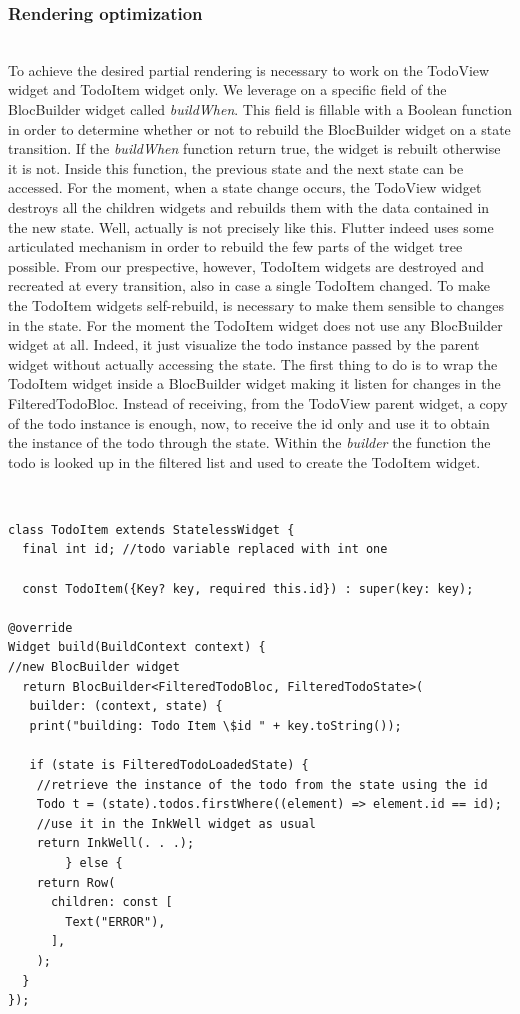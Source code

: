 \subsubsection{Rendering optimization}  \label{par:todo_app_inherited_widget_introduction}
\hfill\\
To achieve the desired partial rendering is necessary to work on the TodoView widget and TodoItem widget only. We leverage on a specific field of the BlocBuilder widget called \textit{buildWhen}. This field is fillable with a Boolean function in order to determine whether or not to rebuild the BlocBuilder widget on a state transition. If the \textit{buildWhen} function return true, the widget is rebuilt otherwise it is not. Inside this function,  the previous state and the next state can be accessed. For the moment, when a state change occurs, the TodoView widget destroys all the children widgets and rebuilds them with the data contained in the new state. Well, actually is not precisely like this. Flutter indeed uses some articulated mechanism in order to rebuild the few parts of the widget tree possible. From our prespective, however, TodoItem widgets are destroyed and recreated at every transition, also in case a single TodoItem changed. To make the TodoItem widgets self-rebuild,  is necessary to make them sensible to changes in the state. For the moment the TodoItem widget does not use any BlocBuilder widget at all. Indeed, it just visualize the todo instance passed by the parent widget without actually accessing the state. The first thing to do  is to wrap the TodoItem widget inside a BlocBuilder widget making it listen for changes in the FilteredTodoBloc. Instead of receiving, from the TodoView parent widget, a copy of the todo instance is enough, now, to receive the id only and use it to obtain the instance of the todo through the state. Within the \textit{builder} the function the todo is looked up in the filtered list and used to create the TodoItem widget. 
\begin{code}
\mbox{}\\
 \mbox{}
\label{code:2.14}
\begin{verbatim}
class TodoItem extends StatelessWidget {
  final int id; //todo variable replaced with int one

  const TodoItem({Key? key, required this.id}) : super(key: key);

@override
Widget build(BuildContext context) {
//new BlocBuilder widget
  return BlocBuilder<FilteredTodoBloc, FilteredTodoState>(
   builder: (context, state) {
   print("building: Todo Item \$id " + key.toString());

   if (state is FilteredTodoLoadedState) {
    //retrieve the instance of the todo from the state using the id
    Todo t = (state).todos.firstWhere((element) => element.id == id);
    //use it in the InkWell widget as usual
    return InkWell(. . .);
        } else {
    return Row(
      children: const [
        Text("ERROR"),
      ],
    );
  }
});
\end{verbatim}
\mbox{}
\end{code}

